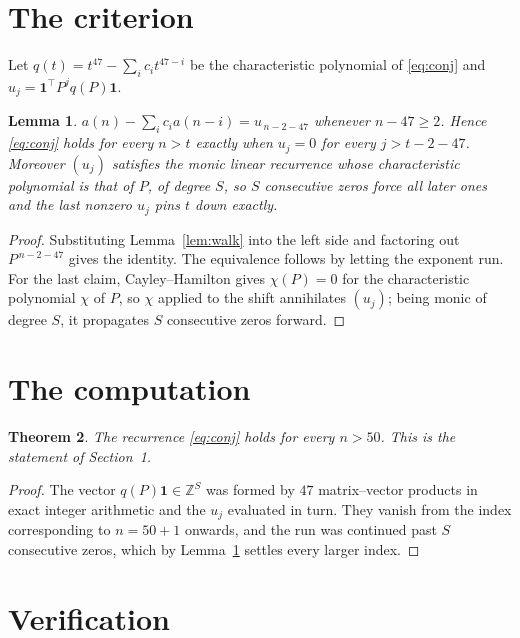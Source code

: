 \documentclass[11pt,a4paper]{article}
\theoremstyle{plain}
\newtheorem{theorem}{Theorem}
\newtheorem{lemma}[theorem]{Lemma}
\theoremstyle{definition}
\begin{document}
\section{The criterion}

Let $q(t)=t^{47}-\sum_i c_i t^{47-i}$ be the characteristic polynomial of
\eqref{eq:conj} and $u_j=\mathbf{1}^{\!\top}P^{j}q(P)\mathbf{1}$.

\begin{lemma}\label{lem:crit}
$a(n)-\sum_i c_i a(n-i)=u_{\,n-2-47}$ whenever $n-47\ge2$. Hence
\eqref{eq:conj} holds for every $n>t$ exactly when $u_j=0$ for every
$j>t-2-47$. Moreover $(u_j)$ satisfies the monic linear recurrence whose
characteristic polynomial is that of $P$, of degree $S$, so $S$ consecutive zeros force all
later ones and the last nonzero $u_j$ pins $t$ down exactly.
\end{lemma}

\begin{proof}
Substituting Lemma~\ref{lem:walk} into the left side and factoring out
$P^{\,n-2-47}$ gives the identity. The equivalence follows by letting the exponent
run. For the last claim, Cayley--Hamilton gives $\chi(P)=0$ for the characteristic
polynomial $\chi$ of $P$, so $\chi$ applied to the shift annihilates $(u_j)$; being monic of
degree $S$, it propagates $S$ consecutive zeros forward.
\end{proof}

\section{The computation}

\begin{theorem}
The recurrence \eqref{eq:conj} holds for every $n>50$. This is the statement of
Section~1.
\end{theorem}

\begin{proof}
The vector $q(P)\mathbf{1}\in\mathbb{Z}^{S}$ was formed by $47$ matrix--vector
products in exact integer arithmetic and the $u_j$ evaluated in turn. They vanish from the
index corresponding to $n=50+1$ onwards, and the run was continued past $S$ consecutive
zeros, which by Lemma~\ref{lem:crit} settles every larger index.
\end{proof}

\section{Verification}
\end{document}
